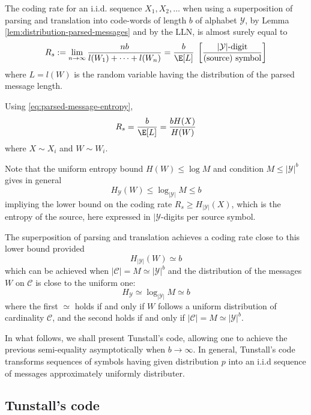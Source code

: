 \documentclass[toc]{../cs-classes/cs-classes}
\begin{document}
\begin{property}
    The coding rate for an i.i.d. sequence $X_1, X_2, \dots$ when using a superposition of parsing and translation into code-words of length $b$ of alphabet $\mathcal{Y}$, by Lemma \ref{lem:distribution-parsed-messages} and by the LLN, is almost surely equal to
    \begin{equation*}
        R_s := \lim_{n\to\infty} \frac{nb}{l(W_1)+\dots+l(W_n)} = \frac{b}{\E[L]} \; \left[\frac{|\mathcal{Y}|\textnormal{-digit}}{\textnormal{(source) symbol}}\right]
    \end{equation*}
    where $L=l(W)$ is the random variable having the distribution of the parsed message length.

    Using \eqref{eq:parsed-message-entropy},
    \begin{equation*}
        R_s = \frac{b}{\E[L]} = \frac{bH(X)}{H(W)}
    \end{equation*}
    where $X\sim X_i$ and $W\sim W_i$.
\end{property}

\begin{remark}
    Note that the uniform entropy bound $H(W)\leq\log M$ and condition $M\leq|\mathcal{Y}|^b$ gives in general
    \begin{equation*}
        H_{\mathcal{Y}}(W)\leq\log_{|\mathcal{Y}|} M\leq b
    \end{equation*}
    impliying the lower bound on the coding rate $R_s\geq H_{|\mathcal{Y}|}(X)$, which is the entropy of the source, here expressed in $|\mathcal{Y}$-digits per source symbol.
\end{remark}

The superposition of parsing and translation achieves a coding rate close to this lower bound provided
\begin{equation*}
    H_{|\mathcal{Y}|}(W) \simeq b
\end{equation*}
which can be achieved when $|\mathcal{C}| = M \simeq |\mathcal{Y}|^b$ and the distribution of the messages $W$ on $\mathcal{C}$ is close to the uniform one:
\begin{equation*}
    H_{\mathcal{Y}} \simeq \log_{|\mathcal{Y}|}M \simeq b
\end{equation*}
where the first $\simeq$ holds if and only if $W$ follows a uniform distribution of cardinality $\mathcal{C}$, and the second holds if and only if $|\mathcal{C}|=M\simeq|\mathcal{Y}|^b$.

In what follows, we shall present Tunstall's code, allowing one to achieve the previous semi-equality asymptotically when $b\to\infty$. In general, Tunstall's code transforms sequences of symbols having given distribution $p$ into an i.i.d sequence of messages approximately uniformly distributer.

\subsection{Tunstall's code}
\end{document}
